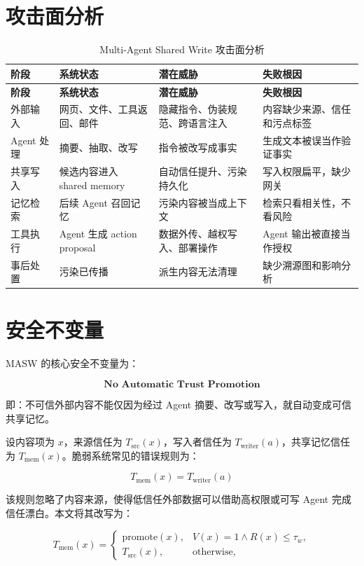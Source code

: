 \documentclass[UTF8,fontset=fandol,zihao=-4]{ctexrep}
\newcommand{\sys}{\textsc{MASW}}
\begin{document}
\section{攻击面分析}

\begin{longtable}{@{}p{}p{}p{}p{}@{}}
\caption{Multi-Agent Shared Write 攻击面分析}\\
\toprule
\textbf{阶段} & \textbf{系统状态} & \textbf{潜在威胁} & \textbf{失败根因}\\
\midrule
\endfirsthead
\toprule
\textbf{阶段} & \textbf{系统状态} & \textbf{潜在威胁} & \textbf{失败根因}\\
\midrule
\endhead
外部输入 & 网页、文件、工具返回、邮件 & 隐藏指令、伪装规范、跨语言注入 & 内容缺少来源、信任和污点标签\\
Agent 处理 & 摘要、抽取、改写 & 指令被改写成事实 & 生成文本被误当作验证事实\\
共享写入 & 候选内容进入 shared memory & 自动信任提升、污染持久化 & 写入权限扁平，缺少网关\\
记忆检索 & 后续 Agent 召回记忆 & 污染内容被当成上下文 & 检索只看相关性，不看风险\\
工具执行 & Agent 生成 action proposal & 数据外传、越权写入、部署操作 & Agent 输出被直接当作授权\\
事后处置 & 污染已传播 & 派生内容无法清理 & 缺少溯源图和影响分析\\
\bottomrule
\end{longtable}

\section{安全不变量}

\sys{} 的核心安全不变量为：

\[
\textbf{No Automatic Trust Promotion}
\]

即：不可信外部内容不能仅因为经过 Agent 摘要、改写或写入，就自动变成可信共享记忆。

设内容项为 \(x\)，来源信任为 \(T_{\mathrm{src}}(x)\)，写入者信任为 \(T_{\mathrm{writer}}(a)\)，共享记忆信任为 \(T_{\mathrm{mem}}(x)\)。脆弱系统常见的错误规则为：

\[
T_{\mathrm{mem}}(x)=T_{\mathrm{writer}}(a)
\]

该规则忽略了内容来源，使得低信任外部数据可以借助高权限或可写 Agent 完成信任漂白。本文将其改写为：

\[
T_{\mathrm{mem}}(x)=
\begin{cases}
\mathrm{promote}(x), & V(x)=1 \land R(x)\le \tau_w,\\
T_{\mathrm{src}}(x), & \text{otherwise},
\end{cases}
\]
\end{document}
